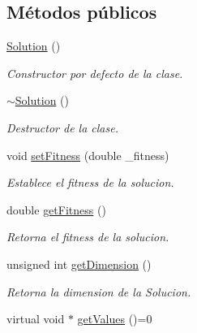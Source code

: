 \subsection*{Métodos públicos}
\begin{DoxyCompactItemize}
\item 
\hypertarget{class_solution_ab55bd4b023d596ce11aaf737b9a6123b}{\hyperlink{class_solution_ab55bd4b023d596ce11aaf737b9a6123b}{Solution} ()}\label{class_solution_ab55bd4b023d596ce11aaf737b9a6123b}

\begin{DoxyCompactList}\small\item\em Constructor por defecto de la clase. \end{DoxyCompactList}\item 
\hypertarget{class_solution_a5d245f7409aacf6ace5e965b7879a580}{\hyperlink{class_solution_a5d245f7409aacf6ace5e965b7879a580}{$\sim$\+Solution} ()}\label{class_solution_a5d245f7409aacf6ace5e965b7879a580}

\begin{DoxyCompactList}\small\item\em Destructor de la clase. \end{DoxyCompactList}\item 
void \hyperlink{class_solution_a14efa947803fd35d6af01aaf83eed17b}{set\+Fitness} (double \+\_\+fitness)
\begin{DoxyCompactList}\small\item\em Establece el fitness de la solucion. \end{DoxyCompactList}\item 
double \hyperlink{class_solution_a794776f952a06bb4a4a7e0f198efcfa2}{get\+Fitness} ()
\begin{DoxyCompactList}\small\item\em Retorna el fitness de la solucion. \end{DoxyCompactList}\item 
unsigned int \hyperlink{class_solution_aeb1c4eb1bd5aca251f43c92720c36d25}{get\+Dimension} ()
\begin{DoxyCompactList}\small\item\em Retorna la dimension de la Solucion. \end{DoxyCompactList}\item 
\hypertarget{class_solution_a856741c28b047bae68aa7cb3721d30bb}{virtual void $\ast$ \hyperlink{class_solution_a856741c28b047bae68aa7cb3721d30bb}{get\+Values} ()=0}\label{class_solution_a856741c28b047bae68aa7cb3721d30bb}


\end{DoxyCompactItemize}
